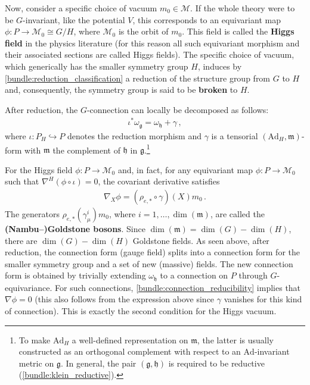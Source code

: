     Now, consider a specific choice of vacuum $m_0\in\mathcal{M}$. If the whole theory were to be $G$-invariant, like the potential $V$, this corresponds to an equivariant map $\phi:P\rightarrow \mathcal{M}_0\cong G/H$, where $\mathcal{M}_0$ is the orbit of $m_0$. This field is called the \textbf{Higgs field} in the physics literature (for this reason all such equivariant morphism and their associated sections are called Higgs fields). The specific choice of vacuum, which generically has the smaller symmetry group $H$, induces by \cref{bundle:reduction_classification} a reduction of the structure group from $G$ to $H$ and, consequently, the symmetry group is said to be \textbf{broken} to $H$.

    After reduction, the $G$-connection can locally be decomposed as follows:
    \begin{gather}
        \iota^*\omega_{\mathfrak{g}} = \omega_{\mathfrak{h}} + \gamma\,,
    \end{gather}
    where $\iota:P_H\hookrightarrow P$ denotes the reduction morphism and $\gamma$ is a tensorial $(\mathrm{Ad}_H,\mathfrak{m})$-form with $\mathfrak{m}$ the complement of $\mathfrak{h}$ in $\mathfrak{g}$.\footnote{To make $\mathrm{Ad}_H$ a well-defined representation on $\mathfrak{m}$, the latter is usually constructed as an orthogonal complement with respect to an $\mathrm{Ad}$-invariant metric on $\mathfrak{g}$. In general, the pair $(\mathfrak{g},\mathfrak{h})$ is required to be reductive (\cref{bundle:klein_reductive}).}

    For the Higgs field $\phi:P\rightarrow\mathcal{M}_0$ and, in fact, for any equivariant map $\phi:P\rightarrow\mathcal{M}_0$ such that $\nabla^H(\phi\circ\iota)=0$, the covariant derivative satisfies
    \begin{gather}
        \nabla_X\phi = (\rho_{e,\ast}\circ\gamma)(X)m_0\,.
    \end{gather}
    The generators $\rho_{e,\ast}(\gamma^i_\mu)m_0$, where $i=1,\ldots,\dim(\mathfrak{m})$, are called the \textbf{(Nambu--)Goldstone bosons}. Since $\dim(\mathfrak{m})=\dim(G)-\dim(H)$, there are $\dim(G)-\dim(H)$ Goldstone fields. As seen above, after reduction, the connection form (gauge field) splits into a connection form for the smaller symmetry group and a set of new (massive) fields. The new connection form is obtained by trivially extending $\omega_{\mathfrak{h}}$ to a connection on $P$ through $G$-equivariance. For such connections, \cref{bundle:connection_reducibility} implies that $\nabla\phi=0$ (this also follows from the expression above since $\gamma$ vanishes for this kind of connection). This is exactly the second condition for the Higgs vacuum.